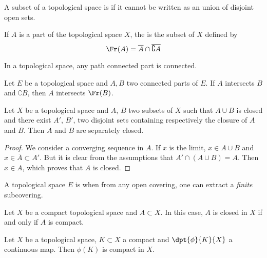 \begin{definition}
A subset of a topological space is  if it cannot be written as an union of disjoint open sets.
\end{definition}

If $A$ is a part of the topological space $X$, the  is the subset of $X$ defined by
\[
   \Fr(A)=\overline{A}\cap\overline{\complement A}
\]

\begin{lemma}
In a topological space, any path connected part is connected.
\end{lemma}

\begin{theorem}
Let $E$ be a topological space and $A,B$ two connected parts of $E$. If $A$ intersects $B$ and $\complement B$, then $A$ intersects $\Fr(B)$.\label{tho:doine}
\end{theorem}


\begin{proposition}
Let $X$ be a topological space and $A$, $B$ two subsets of $X$ such that $A\cup B$ is closed and there exist $A'$, $B'$, two disjoint sets containing respectively the closure of $A$ and $B$. Then $A$ and $B$ are separately closed.\label{prop:sep_ferme}
\end{proposition}

\begin{proof}
We consider a converging sequence in $A$. If $x$ is the limit, $x\in A\cup B$ and $x\in\overline{A}\subset A'$. But it is clear from the assumptions that $A'\cap(A\cup B)=A$. Then $x\in A$, which proves that $A$ is closed.
\end{proof}

\begin{definition}
A topological space $E$ is  when from any open covering, one can extract a \emph{finite} subcovering. \label{def:compact}
\end{definition}

\begin{lemma}
Let $X$ be a compact topological space and $A\subset X$. In this case, $A$ is closed in $X$ if and only if $A$ is compact.
 \label{lem:ferme_compact}
\end{lemma}

\begin{proposition}
Let $X$ be a topological space, $K\subset X$ a compact and $\dpt{\phi}{K}{X}$ a continuous map. Then $\phi(K)$ is compact in $X$.
\end{proposition}

